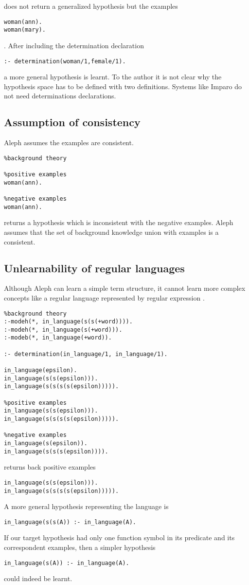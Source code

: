 does not return a generalized hypothesis but the examples
\begin{lstlisting}
woman(ann).
woman(mary).
\end{lstlisting}.
After including the determination declaration
\begin{lstlisting}
:- determination(woman/1,female/1).
\end{lstlisting}
a more general hypothesis  is learnt. To the author it is not clear why the hypothesis space has to be defined with two definitions. Systems like Imparo do not need determinations declarations.

\subsection{Assumption of consistency}
Aleph assumes the examples are consistent.
\begin{lstlisting}
%background theory

%positive examples
woman(ann).

%negative examples
woman(ann).
\end{lstlisting}
returns a hypothesis  which is inconsistent with the negative examples. Aleph assumes that the set of background knowledge union with examples is a consistent.

\subsection{Unlearnability of regular languages}
Although Aleph can learn a simple term structure, it cannot learn more complex concepts like a regular language represented by regular expression .

\begin{lstlisting}
%background theory
:-modeh(*, in_language(s(s(+word)))).
:-modeh(*, in_language(s(+word))).
:-modeb(*, in_language(+word)).

:- determination(in_language/1, in_language/1).

in_language(epsilon).
in_language(s(s(epsilon))).
in_language(s(s(s(s(epsilon))))).

%positive examples
in_language(s(s(epsilon))).
in_language(s(s(s(s(epsilon))))).

%negative examples
in_language(s(epsilon)).
in_language(s(s(s(epsilon)))).
\end{lstlisting}
returns back positive examples
\begin{lstlisting}
in_language(s(s(epsilon))).
in_language(s(s(s(s(epsilon))))).
\end{lstlisting}
A more general hypothesis representing the language is
\begin{lstlisting}
in_language(s(s(A)) :- in_language(A).
\end{lstlisting}
If our target hypothesis had only one function symbol in its predicate and its correspondent examples, then a simpler hypothesis
\begin{lstlisting}
in_language(s(A)) :- in_language(A).
\end{lstlisting}
could indeed be learnt.

